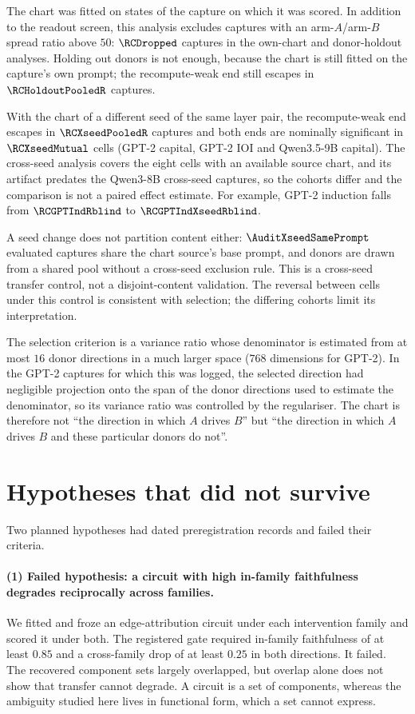 The chart was fitted on states of the capture on which it was scored. In addition to the readout screen,
this analysis excludes captures with an arm-$A$/arm-$B$ spread ratio above $50$: $\RCDropped$ captures in the
own-chart and donor-holdout analyses. Holding out donors is not enough, because the chart is still fitted on the
capture's own prompt; the recompute-weak end still escapes in $\RCHoldoutPooledR$ captures.

With the chart of a different seed of the same layer pair, the
recompute-weak end escapes in $\RCXseedPooledR$ captures and both ends are nominally significant in $\RCXseedMutual$
cells (GPT-2 capital, GPT-2 IOI and Qwen3.5-9B capital). The cross-seed analysis covers the eight cells with an
available source chart, and its artifact predates the Qwen3-8B cross-seed captures, so the cohorts differ and the
comparison is not a paired effect estimate. For example, GPT-2 induction falls from $\RCGPTIndRblind$ to
$\RCGPTIndXseedRblind$.

A seed change does not partition content either:
$\AuditXseedSamePrompt$ evaluated captures share the chart source's base prompt, and donors are drawn from a shared
pool without a cross-seed exclusion rule. This is a cross-seed transfer control, not a disjoint-content
validation. The reversal between cells under this control is consistent with selection; the differing cohorts limit its interpretation.

The selection criterion is a variance ratio whose denominator is estimated from at most $16$ donor directions in a
much larger space ($768$ dimensions for GPT-2). In the GPT-2 captures for which this was logged, the selected direction had
negligible projection onto the span of the donor directions used to estimate the denominator, so its variance ratio was controlled by the
regulariser. The chart is therefore not ``the direction in which $A$ drives $B$'' but ``the direction in which $A$
drives $B$ and these particular donors do not''.

\section{Hypotheses that did not survive}
\label{app:negatives}

Two planned hypotheses had dated preregistration records and failed their criteria.

\paragraph{(1) Failed hypothesis: a circuit with high in-family faithfulness degrades reciprocally across families.} We fitted and froze
an edge-attribution circuit under each intervention family and scored it under both. The registered gate required
in-family faithfulness of at least $0.85$ and a cross-family drop of at least $0.25$ in both directions. It failed.
The recovered component sets largely overlapped, but overlap alone does not show that transfer cannot degrade. A
circuit is a set of components, whereas the ambiguity studied here lives in functional form, which a set cannot
express.

